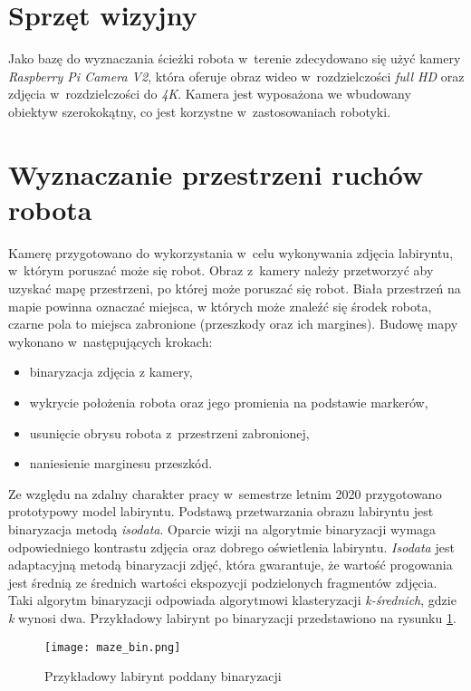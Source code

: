 \section{Sprzęt wizyjny}
Jako bazę do wyznaczania ścieżki robota w~terenie zdecydowano się użyć kamery
\textit{Raspberry Pi Camera V2}, która oferuje obraz wideo w~rozdzielczości
\textit{full HD} oraz zdjęcia w~rozdzielczości do \textit{4K}.
Kamera jest wyposażona we wbudowany obiektyw szerokokątny, co jest korzystne
w~zastosowaniach robotyki.

\section{Wyznaczanie przestrzeni ruchów robota}
Kamerę przygotowano do wykorzystania w~celu wykonywania zdjęcia labiryntu,
w~którym poruszać może się robot.
Obraz z~kamery należy przetworzyć aby uzyskać mapę przestrzeni, po której może
poruszać się robot.
Biała przestrzeń na mapie powinna oznaczać miejsca, w których może znaleźć się 
środek robota, czarne pola to miejsca zabronione (przeszkody oraz ich
margines).
Budowę mapy wykonano w~następujących krokach:
\begin{itemize}
	\item binaryzacja zdjęcia z kamery,
	\item wykrycie położenia robota oraz jego promienia na podstawie markerów,
	\item usunięcie obrysu robota z~przestrzeni zabronionej, 
	\item naniesienie marginesu przeszkód.
\end{itemize}

Ze względu na zdalny charakter pracy w~semestrze letnim 2020 przygotowano
prototypowy model labiryntu.
Podstawą przetwarzania obrazu labiryntu jest binaryzacja metodą
\textit{isodata}.
Oparcie wizji na algorytmie binaryzacji wymaga odpowiedniego kontrastu zdjęcia
oraz dobrego oświetlenia labiryntu.
\textit{Isodata} jest adaptacyjną metodą binaryzacji zdjęć, która gwarantuje,
że wartość progowania jest średnią ze średnich wartości ekspozycji podzielonych
fragmentów zdjęcia.
Taki algorytm binaryzacji odpowiada algorytmowi klasteryzacji
\textit{k-średnich}, gdzie \textit{k} wynosi dwa.
Przykładowy labirynt po binaryzacji przedstawiono na rysunku
\ref{fig:maze_bin}.
\begin{figure}
\centering
\texttt{[image: maze\_bin.png]}
\caption{Przykładowy labirynt poddany binaryzacji}
\label{fig:maze_bin}
\end{figure}

